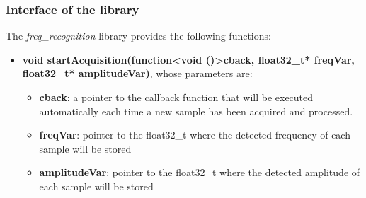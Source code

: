 \subsubsection{Interface of the library}
The \textit{freq\_recognition} library provides the following functions:
\begin{itemize}
	\item \textbf{void startAcquisition(function\textless void ()\textgreater cback, float32\_t* freqVar, float32\_t* amplitudeVar)}, whose parameters are:
	\begin{itemize}
		\item \textbf{cback}: a pointer to the callback function that will be executed automatically each time a new sample has been acquired and processed.
		\item \textbf{freqVar}: pointer to the float32\_t where the detected frequency of each sample will be stored
		\item \textbf{amplitudeVar}: pointer to the float32\_t where the detected amplitude of each sample will be stored
	\end{itemize}
\end{itemize}

